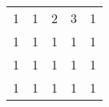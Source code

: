 \begin{table}
\begin{tabular}{lllll}
1 & 1 & 2 & 3 & 1 \\
1 & 1 & 1 & 1 & 1 \\
1 & 1 & 1 & 1 & 1 \\
1 & 1 & 1 & 1 & 1
\end{tabular}
\end{table}